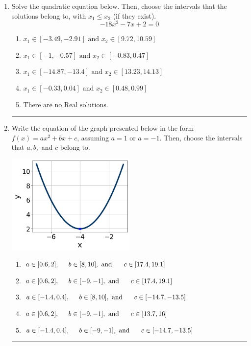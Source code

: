 \documentclass[14pt]{extbook}
\newcommand{\litem}[1]{\item#1\hspace*{-1cm}\rule{\textwidth}{0.4pt}}
\begin{document}
\begin{enumerate}
{\begin{enumerate}[label=\Alph*.]
\end{enumerate} }
\litem{
Solve the quadratic equation below. Then, choose the intervals that the solutions belong to, with $x_1 \leq x_2$ (if they exist).\[ -18x^{2} -7 x + 2 = 0 \]\begin{enumerate}[label=\Alph*.]
\item \( x_1 \in [-3.49, -2.91] \text{ and } x_2 \in [9.72, 10.59] \)
\item \( x_1 \in [-1, -0.57] \text{ and } x_2 \in [-0.83, 0.47] \)
\item \( x_1 \in [-14.87, -13.4] \text{ and } x_2 \in [13.23, 14.13] \)
\item \( x_1 \in [-0.33, 0.04] \text{ and } x_2 \in [0.48, 0.99] \)
\item \( \text{There are no Real solutions.} \)

\end{enumerate} }
\litem{
Write the equation of the graph presented below in the form $f(x)=ax^2+bx+c$, assuming  $a=1$ or $a=-1$. Then, choose the intervals that $a, b,$ and $c$ belong to.
\begin{center}
    \includegraphics[width=0.5\textwidth]{../Figures/quadraticGraphToEquationC.png}
\end{center}
\begin{enumerate}[label=\Alph*.]
\item \( a \in [0.6, 2], \hspace*{5mm} b \in [8, 10], \text{ and } \hspace*{5mm} c \in [17.4, 19.1] \)
\item \( a \in [0.6, 2], \hspace*{5mm} b \in [-9, -1], \text{ and } \hspace*{5mm} c \in [17.4, 19.1] \)
\item \( a \in [-1.4, 0.4], \hspace*{5mm} b \in [8, 10], \text{ and } \hspace*{5mm} c \in [-14.7, -13.5] \)
\item \( a \in [0.6, 2], \hspace*{5mm} b \in [-9, -1], \text{ and } \hspace*{5mm} c \in [13.7, 16] \)
\item \( a \in [-1.4, 0.4], \hspace*{5mm} b \in [-9, -1], \text{ and } \hspace*{5mm} c \in [-14.7, -13.5] \)


\end{enumerate}}
\end{enumerate}
\end{document}
